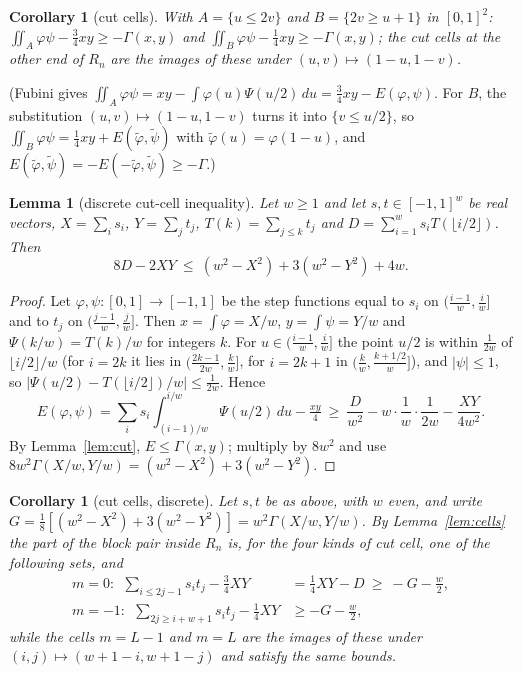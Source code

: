 \documentclass[11pt]{amsart}
\newtheorem{lemma}[theorem]{Lemma}
\newtheorem{corollary}[theorem]{Corollary}
\theoremstyle{remark}
\begin{document}
\begin{corollary}[cut cells]\label{cor:cut}
With $A=\{u\le2v\}$ and $B=\{2v\ge u+1\}$ in $[0,1]^2$: $\iint_A\varphi\psi-\frac34xy\ge-\Gamma(x,y)$ and $\iint_B\varphi\psi-\frac14xy\ge-\Gamma(x,y)$; the cut cells at the other end of $R_n$ are the images of these under $(u,v)\mapsto(1-u,1-v)$.
\end{corollary}
(Fubini gives $\iint_A\varphi\psi=xy-\int\varphi(u)\Psi(u/2)\,du=\frac34xy-E(\varphi,\psi)$. For $B$, the substitution $(u,v)\mapsto(1-u,1-v)$ turns it into $\{v\le u/2\}$, so $\iint_B\varphi\psi=\frac14xy+E(\tilde\varphi,\tilde\psi)$ with $\tilde\varphi(u)=\varphi(1-u)$, and $E(\tilde\varphi,\tilde\psi)=-E(-\tilde\varphi,\tilde\psi)\ge-\Gamma$.)

\begin{lemma}[discrete cut-cell inequality]\label{lem:disc}
Let $w\ge1$ and let $s,t\in[-1,1]^w$ be real vectors, $X=\sum_is_i$, $Y=\sum_jt_j$, $T(k)=\sum_{j\le k}t_j$ and $D=\sum_{i=1}^ws_iT(\lfloor i/2\rfloor)$. Then
\[8D-2XY\ \le\ (w^2-X^2)+3(w^2-Y^2)+4w.\]
\end{lemma}
\begin{proof}
Let $\varphi,\psi\colon[0,1]\to[-1,1]$ be the step functions equal to $s_i$ on $(\frac{i-1}w,\frac iw]$ and to $t_j$ on $(\frac{j-1}w,\frac jw]$. Then $x=\int\varphi=X/w$, $y=\int\psi=Y/w$ and $\Psi(k/w)=T(k)/w$ for integers $k$.
For $u\in(\frac{i-1}w,\frac iw]$ the point $u/2$ is within $\frac1{2w}$ of $\lfloor i/2\rfloor/w$ (for $i=2k$ it lies in $(\frac{2k-1}{2w},\frac kw]$, for $i=2k+1$ in $(\frac kw,\frac{k+1/2}w]$), and $|\psi|\le1$, so
$|\Psi(u/2)-T(\lfloor i/2\rfloor)/w|\le\frac1{2w}$. Hence
\[E(\varphi,\psi)=\sum_is_i\int_{(i-1)/w}^{i/w}\Psi(u/2)\,du-\tfrac{xy}4\ \ge\ \frac D{w^2}-w\cdot\frac1w\cdot\frac1{2w}-\frac{XY}{4w^2}.\]
By Lemma~\ref{lem:cut}, $E\le\Gamma(x,y)$; multiply by $8w^2$ and use $8w^2\Gamma(X/w,Y/w)=(w^2-X^2)+3(w^2-Y^2)$.
\end{proof}
\begin{corollary}[cut cells, discrete]\label{cor:cutdisc}
Let $s,t$ be as above, with $w$ even, and write $G=\frac18[(w^2-X^2)+3(w^2-Y^2)]=w^2\Gamma(X/w,Y/w)$. By Lemma~\ref{lem:cells} the part of the block pair inside $R_n$ is, for the four kinds of cut cell, one of the following sets, and
\begin{align*}
m=0:\ \ \sum_{i\le2j-1}s_it_j-\tfrac34XY&=\tfrac14XY-D\ \ge\ -G-\tfrac w2,\\
m=-1:\ \ \sum_{2j\ge i+w+1}s_it_j-\tfrac14XY&\ge-G-\tfrac w2,
\end{align*}
while the cells $m=L-1$ and $m=L$ are the images of these under $(i,j)\mapsto(w+1-i,w+1-j)$ and satisfy the same bounds.
\end{corollary}
\end{document}
